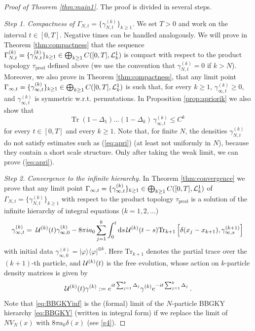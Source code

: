 \documentclass[11pt]{article}
\newcommand{\rd}{{\rm d}}
\newcommand{\ph}{\varphi}
\newcommand{\cU}{{\cal U}}
\newcommand{\tr}{\mbox{Tr}}
\newcommand{\cL}{{\cal L}}
\begin{document}
\medskip
\begin{proof}[Proof of Theorem \ref{thm:main1}] The proof is divided
in several steps.

\medskip

{\it Step 1. Compactness of $\Gamma_{N,t}=\{ \gamma^{(k)}_{N,t}
\}_{k\geq 1}$.} We set $T>0$ and work on the interval $t\in [0, T]$.
Negative times can be handled analogously. We will prove in Theorem
\ref{thm:compactness} that the sequence $\Gamma_{N,t}^{(k)} = \{
\gamma^{(k)}_{N,t} \}_{k \geq 1} \in \bigoplus_{k \geq 1} C([0,T],
\cL^1_k)$ is compact with respect to the product topology
$\tau_{\text{prod}}$ defined above (we use the convention that
$\gamma^{(k)}_{N,t} =0$ if $k >N$). Moreover, we also prove in Theorem
\ref{thm:compactness}, that any limit point $\Gamma_{\infty,t} =
\{\gamma_{\infty,t}^{(k)} \}_{k\geq 1} \in \bigoplus_{k \geq 1} C (
[0,T], \cL^1_k)$ is such that, for every $k \geq 1$,
$\gamma_{\infty,t}^{(k)} \geq 0$, and $\gamma_{\infty,t}^{(k)}$ is
symmetric w.r.t. permutations. In Proposition \ref{prop:apriorik} we
also show that
\begin{equation}\label{eq:apri}
\tr \; (1-\Delta_1) \dots (1-\Delta_k) \, \gamma^{(k)}_{\infty,t}
\leq C^k
\end{equation}
for every $t \in [0,T]$ and every $k \geq 1$. Note that, for finite
$N$, the densities $\gamma^{(k)}_{N,t}$ do not satisfy estimates
such as (\ref{eq:apri}) (at least not uniformly in $N$), because
they contain a short scale structure. Only after taking the weak
limit, we can prove (\ref{eq:apri}).

\medskip

{\it Step 2. Convergence to the infinite hierarchy.} In Theorem
\ref{thm:convergence} we prove that any limit point $
\Gamma_{\infty,t} = \{ \gamma_{\infty,t}^{(k)} \}_{k\geq 1} \in
\bigoplus_{k\geq 1} C([0,T], \cL^1_k)$ of $\Gamma_{N,t} = \{
\gamma_{N,t}^{(k)} \}_{k\ge1}$ with respect to the product topology
$\tau_{\text{prod}}$ is a solution of the infinite hierarchy of
integral equations ($k=1,2, \ldots$)
\begin{equation}\label{eq:BBGKYinf}
\gamma_{\infty,t}^{(k)}  = \; \cU^{(k)} (t) \gamma_{\infty,0}^{(k)}
- 8\pi i a_0 \sum_{j=1}^k \int_0^t \rd s \, \cU^{(k)} (t-s)
\tr_{k+1} \left[ \delta (x_j -x_{k+1}),
\gamma_{\infty,s}^{(k+1)}\right]\,
\end{equation}
with initial data $\gamma_{\infty,0}^{(k)} = |\ph\rangle
\langle\ph|^{\otimes k}$. Here $\tr_{k+1}$ denotes the partial trace
over the $(k+1)$-th particle, and  $\cU^{(k)} (t)$ is the free
evolution, whose action on $k$-particle density matrices is given by
\[\cU^{(k)} (t) \gamma^{(k)} := e^{it\sum_{j=1}^k \Delta_j}
\gamma^{(k)} e^{-it\sum_{j=1}^k \Delta_j}\,. \] Note that
\eqref{eq:BBGKYinf} is the (formal) limit of the $N$-particle BBGKY
hierarchy  \eqref{eq:BBGKY} (written in integral form) if we replace
the limit of $NV_N(x)$ with $8\pi a_0\delta(x)$ (see \eqref{g4}).


\end{proof}
\end{document}
